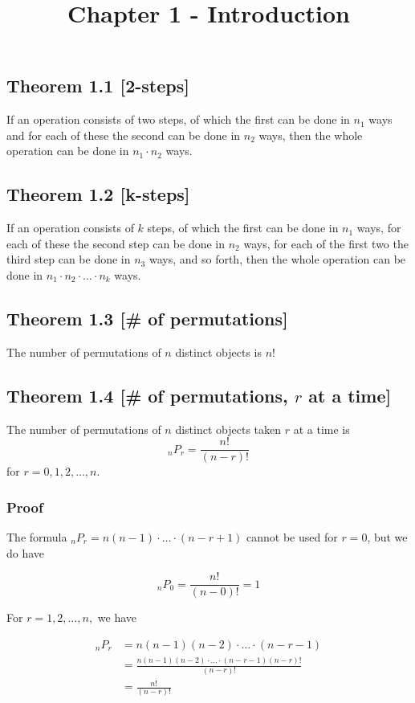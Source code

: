 \documentclass{article}
\title{Chapter 1 - Introduction}
\begin{document}
\maketitle



\subsection*{Theorem 1.1 [2-steps]}
If an operation consists of two steps, of which the first can be done in \(n_1\) ways and for each of these the second can be done in \(n_2\) ways, then the whole operation can be done in \(n_1 \cdot n_2\) ways.

\subsection*{Theorem 1.2 [k-steps]}
If an operation consists of \(k\) steps, of which the first can be done in \(n_1\) ways, for each of these the second step can be done in \(n_2\) ways, for each of the first two the third step can be done in \(n_3\) ways, and so forth, then the whole operation can be done in \(n_1 \cdot n_2 \cdot \ldots \cdot n_k\) ways.

\subsection*{Theorem 1.3 [\# of permutations]} The number of permutations of \(n\) distinct objects is \(n!\)

\subsection*{Theorem 1.4 [\# of permutations, \(r\) at a time]} The number of permutations of \(n\) distinct objects taken \(r\) at a time is
\[{}_nP_r = \frac{n!}{(n-r)!}\]
for \(r=0,1,2,\ldots,n\).

\subsubsection*{Proof} The formula \({}_nP_r=n(n-1) \cdot \ldots \cdot (n-r+1)\) cannot be used for \(r=0\), but we do have

\[{}_nP_0 = \frac{n!}{(n-0)!}=1\]

For \(r=1,2,\ldots,n,\) we have


\begin{align}
{}_nP_r&=n(n-1)(n-2) \cdot \ldots \cdot (n-r-1)\\
&=\frac{n(n-1)(n-2) \cdot \ldots \cdot (n-r-1)(n-r)!}{(n-r)!}\\
&=\frac{n!}{(n-r)!}
\end{align}
\end{document}

